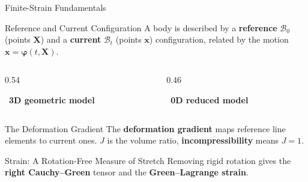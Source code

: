 \begin{frame}[t]{}
  \vfill\begin{center}{\Huge\color{YaleBlue} Finite-Strain Fundamentals}
  \end{center}\vfill
\end{frame}

\begin{frame}[t]{Reference and Current Configuration}
  A body is described by a \textbf{reference} $\mathcal{B}_0$ (points $\bm{X}$) and
  a \textbf{current} $\mathcal{B}_t$ (points $\bm{x}$) configuration, related by the motion
  $\bm{x}=\bm{\varphi}(t,\bm{X})$.
  \vfill
  \begin{columns}[T]
    \begin{column}{0.54\textwidth}
      \begin{center}\tagd\ \textbf{3D geometric model}\end{center}
      \vfill
      \begin{center}\configmap[0.92]\end{center}
      \vfill
    \end{column}
    \begin{column}{0.46\textwidth}
      \begin{center}\tagz\ \textbf{0D reduced model}\end{center}
      \vfill
      \begin{center}\scalarmap[1.15]\end{center}
      \vfill
    \end{column}
  \end{columns}
\end{frame}

\begin{frame}[t]{The Deformation Gradient}
  The \textbf{deformation gradient} maps reference line elements to current ones.
  $J$ is the volume ratio, \textbf{incompressibility} means $J=1$.
\end{frame}

\begin{frame}[t]{Strain: A Rotation-Free Measure of Stretch}
  Removing rigid rotation gives the \textbf{right Cauchy--Green} tensor and the \textbf{Green--Lagrange strain}.
\end{frame}

